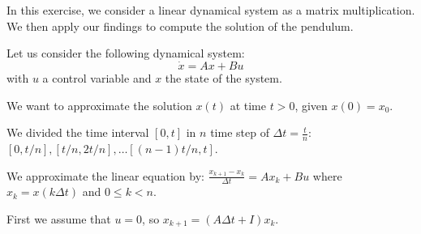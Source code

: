 
In this exercise, we consider a linear dynamical system as a matrix multiplication. We then apply our findings to compute the solution of the pendulum.

Let us consider the following dynamical system:
\[ \Dot{x} = A x + B u\]
with $u$ a control variable and $x$ the state of the system.

We want to approximate the solution $x(t)$ at time $t>0$, given $x(0)=x_0$.

We divided the time interval $[0, t]$ in $n$ time step of $\Delta t = \frac{t}{n}$: $[0, t/n], [t/n, 2t/n], \dots [(n-1)t/n, t]$.

We approximate the linear equation by:
$\frac{x_{k+1}-x_{k}}{\Delta t} = A x_k + B u$ where $x_k = x(k\Delta t)$ and $0\leq k <n$.

First we assume that $u = 0$, so $x_{k+1} = (A \Delta t + I) x_k$.


